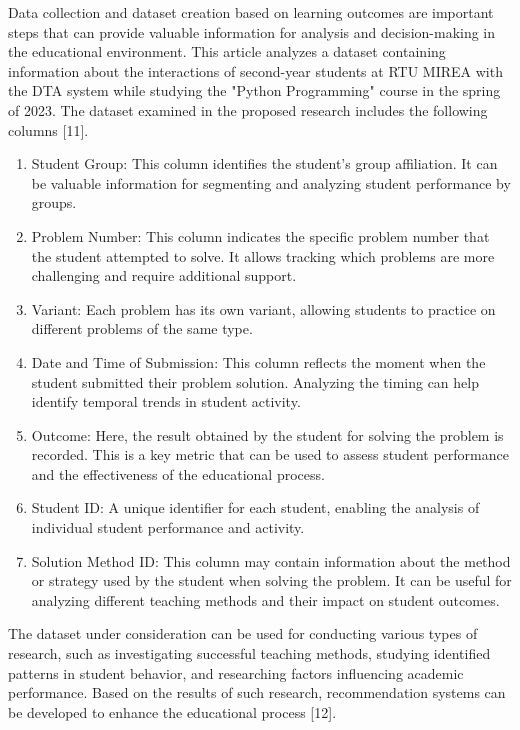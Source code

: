 \documentclass{article}
\begin{document}
\begin{multicols}{2}
\begin{justify}
      Data collection and dataset creation based on learning outcomes are important steps that can provide valuable information for analysis and decision-making in the educational environment. This article analyzes a dataset containing information about the interactions of second-year students at RTU MIREA with the DTA system while studying the "Python Programming" course in the spring of 2023. The dataset examined in the proposed research includes the following columns [11].

      \begin{enumerate}
        \item Student Group: This column identifies the student's group affiliation. It can be valuable information for segmenting and analyzing student performance by groups.
        \item Problem Number: This column indicates the specific problem number that the student attempted to solve. It allows tracking which problems are more challenging and require additional support.
        \item Variant: Each problem has its own variant, allowing students to practice on different problems of the same type.
        \item	Date and Time of Submission: This column reflects the moment when the student submitted their problem solution. Analyzing the timing can help identify temporal trends in student activity.
        \item	Outcome: Here, the result obtained by the student for solving the problem is recorded. This is a key metric that can be used to assess student performance and the effectiveness of the educational process.
        \item	Student ID: A unique identifier for each student, enabling the analysis of individual student performance and activity.
        \item	Solution Method ID: This column may contain information about the method or strategy used by the student when solving the problem. It can be useful for analyzing different teaching methods and their impact on student outcomes.
      \end{enumerate}

      The dataset under consideration can be used for conducting various types of research, such as investigating successful teaching methods, studying identified patterns in student behavior, and researching factors influencing academic performance. Based on the results of such research, recommendation systems can be developed to enhance the educational process [12].


\end{justify}
\end{multicols}
\end{document}
